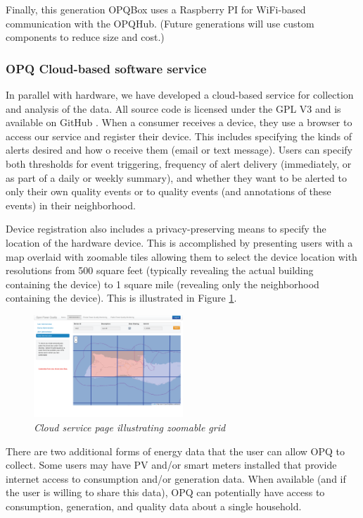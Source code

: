Finally, this generation OPQBox uses a Raspberry PI for WiFi-based communication with the OPQHub. (Future generations will use custom components to reduce size and cost.)

\subsubsection{OPQ Cloud-based software service}

In parallel with hardware, we have developed a cloud-based service for collection and analysis of the data. All source code is licensed under the GPL V3 and is available on GitHub \cite{opq-github}.  When a consumer receives a device, they use a browser to access our service and register their device. This includes specifying the kinds of alerts desired and how o receive them (email or text message).  Users can specify both thresholds for event triggering, frequency of alert delivery (immediately, or as part of a daily or weekly summary), and whether they want to be alerted to only their own quality events or to quality events (and annotations of these events) in their neighborhood.  

Device registration also includes a privacy-preserving means to specify the location of the hardware device. This is accomplished by presenting users with a map overlaid with zoomable tiles allowing them to select the device location with resolutions from 500 square feet (typically revealing the actual building containing the device) to 1 square mile (revealing only the neighborhood containing the device). This is illustrated in Figure \ref{fig:cloud-grid}.

\begin{figure}
  \includegraphics[width=0.5\textwidth]{figures/cloud-grid.eps}
  \caption{\em \small Cloud service page illustrating zoomable grid}
  \label{fig:cloud-grid}
\end{figure}  


There are two additional forms of energy data that the user can allow OPQ to collect.  Some users may have PV and/or smart meters installed that provide internet access to consumption and/or generation data.  When available (and if the user is willing to share this data), OPQ can potentially have access to consumption, generation, and quality data about a single household.


